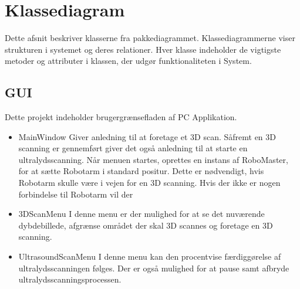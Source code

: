 \section{Klassediagram}
Dette afsnit beskriver klasserne fra pakkediagrammet. Klassediagrammerne viser strukturen i systemet og deres relationer. Hver klasse indeholder de vigtigste metoder og attributer i klassen, der udgør funktionaliteten i System. 

\subsection{GUI}
Dette projekt indeholder brugergrænsefladen af PC Applikation.

\let\labelitemi\labelitemii
\begin{itemize}
\item{MainWindow}\newline
Giver anledning til at foretage et 3D scan. Såfremt en 3D scanning er gennemført giver det også anledning til at starte en ultralydsscanning.
Når menuen startes, oprettes en instans af RoboMaster, for at sætte Robotarm i standard positur. Dette er nødvendigt, hvis Robotarm skulle være i vejen for en 3D scanning.
Hvis der ikke er nogen forbindelse til Robotarm vil der 

\item{3DScanMenu}\newline
I denne menu er der mulighed for at se det nuværende dybdebillede, afgrænse området der skal 3D scannes og foretage en 3D scanning.

\item{UltrasoundScanMenu}\newline
I denne menu kan den procentvise færdiggørelse af ultralydsscanningen følges. Der er også mulighed for at pause samt afbryde ultralydsscanningsprocessen.
\end{itemize}

